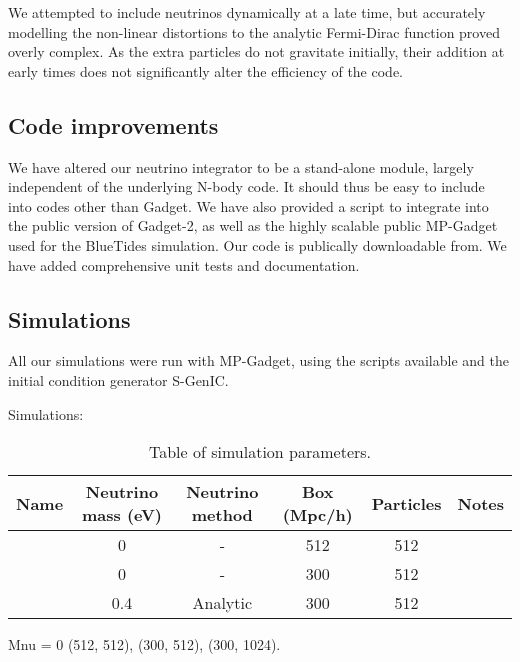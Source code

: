 \documentclass[useAMS, usenatbib]{mnras}
\begin{document}
We attempted to include neutrinos dynamically at a late time, but
accurately modelling the non-linear distortions to the analytic
Fermi-Dirac function proved overly complex. As the extra particles
do not gravitate initially, their addition at early times does
not significantly alter the efficiency of the code.


\subsection{Code improvements}
\label{sec:code}

We have altered our neutrino integrator to be a stand-alone module, largely
independent of the underlying N-body code. It should thus be easy to include
into codes other than Gadget. We have also provided a script to integrate into the
public version of Gadget-2, as well as the highly scalable public MP-Gadget
used for the BlueTides simulation. Our code is publically downloadable from.
We have added comprehensive unit tests and documentation.

\subsection{Simulations}
\label{sec:simulations}

All our simulations were run with MP-Gadget, using the scripts available
and the initial condition generator S-GenIC.

Simulations:
\begin{table}
\begin{center}
\begin{tabular}{|l|c|c|c|c|l|}
\hline
Name & Neutrino mass (eV) & Neutrino method & Box (Mpc/h) & Particles & Notes \\
\hline
    &       0             &    -          & 512         & 512       &       \\
    &       0             &    -          & 300         & 512       &       \\
    &     0.4             &   Analytic    & 300         & 512       &       \\
    
\hline
\end{tabular}
\end{center}
\caption{Table of simulation parameters. 
}
\label{tab:simulations}
\end{table}

Mnu = 0  (512, 512), (300, 512), (300, 1024).
\end{document}
